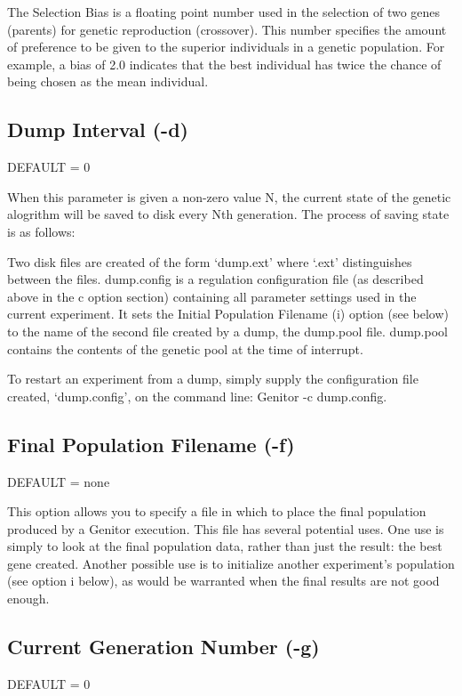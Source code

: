 The Selection Bias is a floating point number used in the selection of 
two genes (parents) for genetic reproduction (crossover).  This number 
specifies the amount of preference to be given to the superior individuals
in a genetic population.  For example, a bias of 2.0 indicates that the
best individual has twice the chance of being chosen as the mean individual.



\subsection*{Dump Interval (-d)}
DEFAULT = 0

When this parameter is given a non-zero value N, the current state of the
genetic alogrithm will be saved to disk every Nth generation.  The process
of saving state is as follows:

Two disk files are created of the form `dump.ext' where `.ext' distinguishes
between the files. dump.config is a regulation configuration file (as described
above in the c option section) containing all parameter settings used in the
current experiment.  It sets the Initial Population Filename (i) option
(see below) to the name of the second file created by a dump, the dump.pool
file.  dump.pool contains the contents of the genetic pool at the time of
interrupt.

To restart an experiment from a dump, simply supply the configuration file
created, `dump.config', on the command line: Genitor -c dump.config. 


\subsection*{Final Population Filename (-f)}
DEFAULT = none

This option allows you to specify a file in which to place the final population
produced by a Genitor execution.  This file has several potential uses.  One
use is simply to look at the final population data, rather than just the result:
the best gene created.  Another possible use is to initialize another experiment's
population (see option i below), as would be warranted when the final results are 
not good enough.



\subsection*{Current Generation Number (-g)}
DEFAULT = 0

